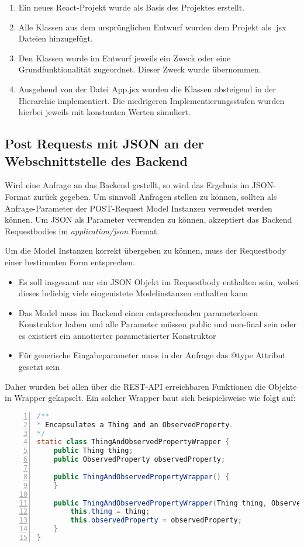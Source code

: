 \begin{enumerate}
    \item Ein neues React-Projekt wurde als Basis des Projektes erstellt.
    \item Alle Klassen aus dem ursprünglichen Entwurf wurden dem Projekt als .jsx Dateien hinzugefügt.
    \item Den Klassen wurde im Entwurf jeweils ein Zweck oder eine Grundfunktionalität zugeordnet. Dieser Zweck wurde übernommen.
    \item Ausgehend von der Datei App.jsx wurden die Klassen absteigend in der Hierarchie implementiert. Die niedrigeren Implementierungsstufen wurden hierbei jeweils mit konstanten Werten simuliert.
\end{enumerate}

\subsection{Post Requests mit JSON an der Webschnittstelle des Backend}
Wird eine Anfrage an das Backend gestellt, so wird das Ergebnis im \gls{JSON}-Format zurück gegeben.
Um sinnvoll Anfragen stellen zu können, sollten als Anfrage-Parameter der POST-Request Model Instanzen verwendet werden können.
Um JSON als Parameter verwenden zu können, akzeptiert das Backend Requestbodies im \textit{application/json} Format.

Um die Model Instanzen korrekt übergeben zu können, muss der Requestbody einer bestimmten Form entsprechen.
\begin{itemize}[noitemsep]
    \item Es soll insgesamt nur ein JSON Objekt im Requestbody enthalten sein, wobei dieses beliebig viele eingenistete Modelinstanzen enthalten kann
    \item Das Model muss im Backend einen entsprechenden parameterlosen Konstruktor haben und alle Parameter müssen public und non-final sein oder es existiert ein annotierter parametisierter Konstruktor
    \item Für generische Eingabeparameter muss in der Anfrage das @type Attribut gesetzt sein
\end{itemize}
Daher wurden bei allen über die REST-API erreichbaren Funktionen die Objekte in Wrapper gekapselt.
Ein solcher Wrapper baut sich beispielsweise wie folgt auf:
\begin{lstlisting}[language=java,
    basicstyle=\normalfont\ttfamily,
    numbers=left,
    numberstyle=\scriptsize,
    stepnumber=1,
    numbersep=8pt,
    showstringspaces=false,
    breaklines=true,
    frame=lines,
    backgroundcolor=\color{background}]
/**
* Encapsulates a Thing and an ObservedProperty.
*/
static class ThingAndObservedPropertyWrapper {
    public Thing thing;
    public ObservedProperty observedProperty;

    public ThingAndObservedPropertyWrapper() {
    }

    public ThingAndObservedPropertyWrapper(Thing thing, ObservedProperty observedProperty) {
        this.thing = thing;
        this.observedProperty = observedProperty;
    }
}
\end{lstlisting}

